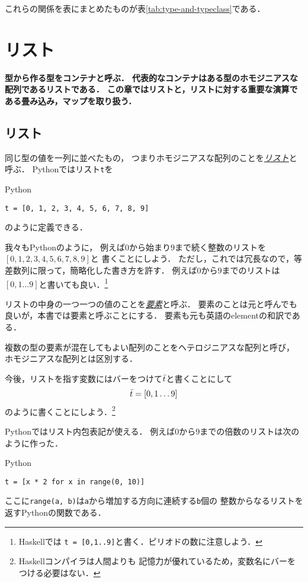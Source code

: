 \documentclass[a5paper,draft]{jsbook}
\newcommand{\programminglanguage}[1]{\textsf{#1}}
\newcommand{\haskell}{\programminglanguage{Haskell}}
\newcommand{\python}{\programminglanguage{Python}}
\newenvironment{leader}{\begingroup\bf}{\endgroup}
\newcommand{\keyword}[1]{{\underline{\emph{#1}}}}
\newcommand{\code}[1]{\texttt{#1}}
\newenvironment{pythoncode}{\begin{itembox}[r]{\python}}{\end{itembox}}
\newcommand{\pthnId}[1]{{DO NOT USE}--\textit{#1}}
\newcommand{\pthnKeyword}[1]{{DO NOT USE}--\textbf{#1}}
\newcommand{\pthnOp}[1]{{DO NOT USE}--\texttt{#1}}
\newcommand{\mathListVar}[1]{\Bar{#1}}
\begin{document}
これらの関係を表にまとめたものが表\ref{tab:type-and-typeclass}である．

\chapter{リスト}
\begin{leader}
型から作る型をコンテナと呼ぶ．
代表的なコンテナはある型のホモジニアスな配列であるリストである．
この章ではリストと，リストに対する重要な演算である畳み込み，マップを取り扱う．
\end{leader}


\section{リスト}

同じ型の値を一列に並べたもの，
つまりホモジニアスな配列のことを\keyword{リスト}と呼ぶ．
\python ではリスト\code{t}を
\begin{pythoncode}
\begin{verbatim}
t = [0, 1, 2, 3, 4, 5, 6, 7, 8, 9]
\end{verbatim}
\end{pythoncode}
のように定義できる．

我々も\python のように，
例えば$0$から始まり$9$まで続く整数のリストを$[0,1,2,3,4,5,6,7,8,9]$と
書くことにしよう．
ただし，これでは冗長なので，等差数列に限って，簡略化した書き方を許す．
例えば$0$から$9$までのリストは$[0,1\dots9]$と書いても良い．\footnote{\haskell では
\code{t = [0,1..9]}と書く．ピリオドの数に注意しよう．}

リストの中身の一つ一つの値のことを\keyword{要素}と呼ぶ．
要素のことは元と呼んでも良いが，本書では要素と呼ぶことにする．
要素も元も英語のelementの和訳である．

複数の型の要素が混在してもよい配列のことをヘテロジニアスな配列と呼び，
ホモジニアスな配列とは区別する．

今後，リストを指す変数にはバーをつけて$\mathListVar{t}$と書くことにして
\begin{equation}
\mathListVar{t}=[0,1\dots9]
\end{equation}
のように書くことにしよう．\footnote{\haskell コンパイラは人間よりも
記憶力が優れているため，変数名にバーをつける必要はない．}

\python ではリスト内包表記が使える．
例えば$0$から$9$までの倍数のリストは次のように作った．
\begin{pythoncode}
\begin{verbatim}
t = [x * 2 for x in range(0, 10)]
\end{verbatim}
\end{pythoncode}
ここに\code{range(a, b)}は\code{a}から増加する方向に連続する\code{b}個の
整数からなるリストを返す\python の関数である．
\end{document}
